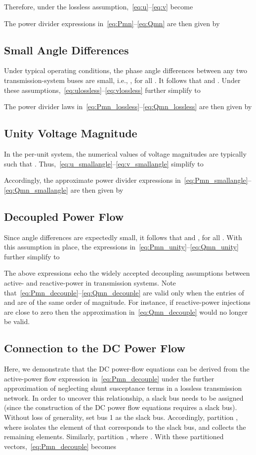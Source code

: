 \documentclass[journal]{IEEEtran}
\theoremstyle{definition}
\begin{document}
Therefore, under the lossless assumption,~\eqref{eq:u}--\eqref{eq:v} become

The power divider expressions in~\eqref{eq:Pmn}--\eqref{eq:Qmn} are then given by


\subsection{Small Angle Differences}
Under typical operating conditions, the phase angle differences between any two transmission-system buses are small, i.e., , for all .  It follows that  and .  Under these assumptions,~\eqref{eq:ulossless}--\eqref{eq:vlossless} further simplify to

The power divider laws in~\eqref{eq:Pmn_lossless}--\eqref{eq:Qmn_lossless} are then given by


\subsection{Unity Voltage Magnitude} \label{sec:UnitVoltage}
In the per-unit system, the numerical values of voltage magnitudes are typically such that .  Thus,~\eqref{eq:u_smallangle}--\eqref{eq:v_smallangle} simplify to

Accordingly, the approximate power divider expressions in~\eqref{eq:Pmn_smallangle}--\eqref{eq:Qmn_smallangle} are then given by


\subsection{Decoupled Power Flow} \label{sec:decouple}
Since angle differences are expectedly small, it follows that  and , for all . With this assumption in place, the expressions in~\eqref{eq:Pmn_unity}--\eqref{eq:Qmn_unity} further simplify to

The above expressions echo the widely accepted decoupling assumptions between active- and reactive-power in transmission systems.  Note that~\eqref{eq:Pmn_decouple}--\eqref{eq:Qmn_decouple} are valid only when the entries of  and  are of the same order of magnitude. For instance, if reactive-power injections are close to zero then the approximation in~\eqref{eq:Qmn_decouple} would no longer be valid.  

\subsection{Connection to the DC Power Flow} \label{rem:DCPowerFlow}
Here, we demonstrate that the DC power-flow equations can be derived from the active-power flow expression in~\eqref{eq:Pmn_decouple} under the further approximation of neglecting shunt susceptance terms in a lossless transmission network.  In order to uncover this relationship, a slack bus needs to be assigned (since the construction of the DC power flow equations requires a slack bus).  Without loss of generality, set bus 1 as the slack bus.  Accordingly, partition , where  isolates the element of  that corresponds to the slack bus, and  collects the remaining elements.  Similarly, partition , where .  With these partitioned vectors,~\eqref{eq:Pmn_decouple} becomes
\end{document}
